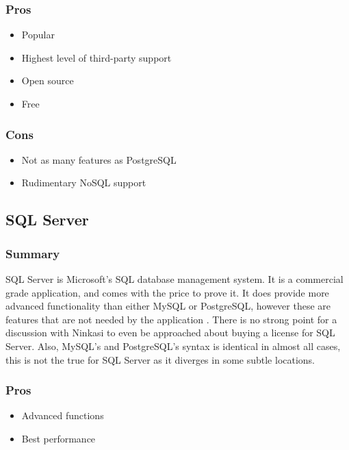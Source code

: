 \documentclass[draftclsnofoot,onecolumn,journal,letterpaper,compsoc,10pt]{IEEEtran}
\begin{document}
        \subsubsection{Pros}
        \begin{itemize}
            \item Popular
            \item Highest level of third-party support
            \item Open source
            \item Free
        \end{itemize}
        
        \subsubsection{Cons}
        \begin{itemize}
            \item Not as many features as PostgreSQL
            \item Rudimentary NoSQL support
        \end{itemize}
        
    \subsection{SQL Server}
    
        \subsubsection{Summary}
        
        SQL Server is Microsoft's SQL database management system.  It is a commercial grade application, and comes with the price to prove it.  It does provide more advanced functionality than either MySQL or PostgreSQL, however these are features that are not needed by the application \cite{sql_server}.  There is no strong point for a discussion with Ninkasi to even be approached about buying a license for SQL Server.  Also, MySQL's and PostgreSQL's syntax is identical in almost all cases, this is not the true for SQL Server as it diverges in some subtle locations.
        
        \subsubsection{Pros}
        \begin{itemize}
            \item Advanced functions
            \item Best performance
        \end{itemize}
        
\end{document}
